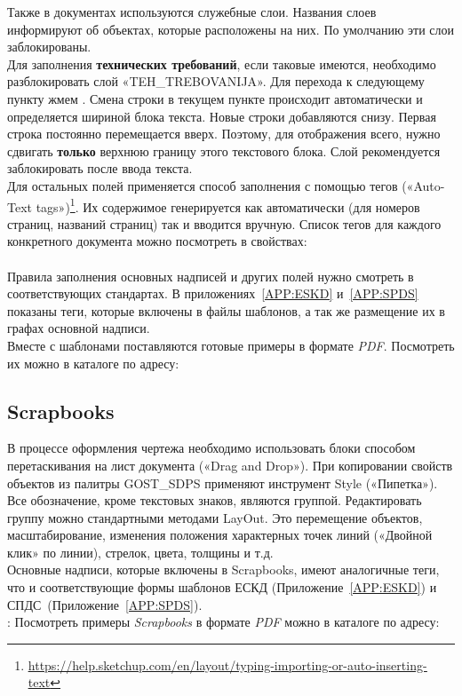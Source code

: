 \documentclass[14pt]{extreport}
\begin{document}
Также в документах используются служебные слои. Названия слоев информируют об объектах, которые расположены на них. По умолчанию эти слои заблокированы.\\
Для заполнения \textbf{технических требований}, если таковые имеются, необходимо разблокировать слой «\textsf{TEH\_TREBOVANIJA}». Для перехода к следующему пункту жмем \keys{\enter}. Смена строки в текущем пункте происходит автоматически и определяется шириной блока текста.
Новые строки добавляются снизу. Первая  строка постоянно перемещается вверх.  Поэтому, для отображения всего, нужно сдвигать \textbf{только} верхнюю границу этого текстового блока. Слой рекомендуется заблокировать после ввода текста.\\

Для остальных полей применяется способ заполнения с помощью тегов («Auto-Text tags»)\footnote{\href{https://help.sketchup.com/en/layout/typing-importing-or-auto-inserting-text}{\uline{https://help.sketchup.com/en/layout/typing-importing-or-auto-inserting-text}}}. Их содержимое генерируется как автоматически (для номеров страниц, названий страниц) так и вводится вручную. Список тегов для каждого конкретного документа можно посмотреть в свойствах:\\

\noindent
{}\\

Правила заполнения основных надписей и других полей нужно смотреть в соответствующих стандартах. В приложениях~\ref{APP:ESKD} и~\ref{APP:SPDS} показаны теги, которые включены в файлы шаблонов, а так же размещение их в графах основной надписи.\\

Вместе с шаблонами поставляются готовые примеры в формате \emph{PDF}. Посмотреть их можно в каталоге по адресу:\\

\noindent
{\small {}}

\subsection{Scrapbooks}
В процессе оформления чертежа необходимо использовать блоки способом перетаскивания на лист документа («Drag and Drop»). При копировании свойств объектов из палитры \textsf{GOST\_SDPS} применяют инструмент \textsf{Style} («Пипетка»).
Все обозначение, кроме текстовых знаков, являются группой. Редактировать группу можно стандартными методами LayOut. Это перемещение объектов, масштабирование, изменения положения характерных точек линий («Двойной клик» по линии), стрелок, цвета, толщины и т.д.\\
Основные надписи, которые включены в Scrapbooks, имеют аналогичные теги, что и соответствующие формы шаблонов ЕСКД (Приложение~\ref{APP:ESKD}) и СПДС~(Приложение~\ref{APP:SPDS}).\\
:
Посмотреть примеры \textit{Scrapbooks} в формате \emph{PDF} можно в каталоге по адресу:\\
\end{document}
